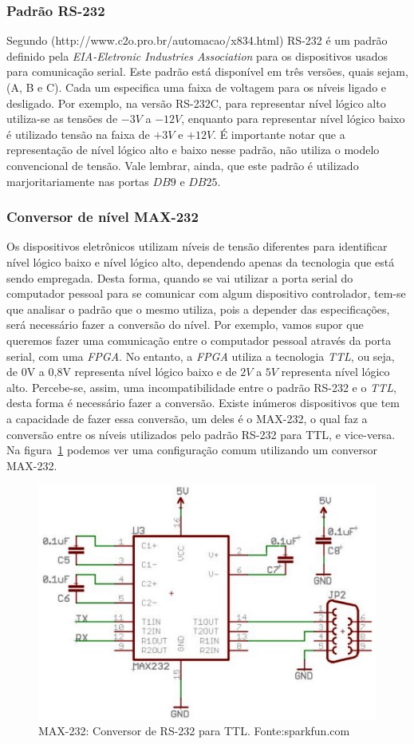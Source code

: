 \documentclass[12pt]{article}
\begin{document}
\subsubsection{Padrão RS-232}
Segundo (http://www.c2o.pro.br/automacao/x834.html) RS-232 é um padrão definido pela \textit{EIA-Eletronic Industries Association} para os dispositivos usados para comunicação serial. Este padrão está disponível em três versões, quais sejam, (A, B e C). Cada um especifica uma faixa de voltagem para os níveis ligado e desligado. Por exemplo, na versão RS-232C, para representar  nível lógico alto utiliza-se as tensões de $-3V$ a $-12V$, enquanto para representar nível lógico baixo é utilizado tensão na faixa de $+3V$ e $+12V$. É importante notar que a representação de nível lógico alto e baixo nesse padrão, não utiliza o modelo convencional de tensão. Vale lembrar, ainda, que este padrão é utilizado marjoritariamente nas portas $DB9$ e $DB25$.  

\subsubsection{Conversor de nível MAX-232}
Os dispositivos eletrônicos utilizam níveis de tensão diferentes para identificar nível lógico baixo e nível lógico alto, dependendo apenas da tecnologia que está sendo empregada. Desta forma, quando se vai utilizar a porta serial do computador pessoal para se comunicar com algum dispositivo controlador, tem-se que analisar o padrão que o mesmo utiliza, pois a depender das especificações, será necessário fazer a conversão do nível. Por exemplo, vamos supor que queremos fazer uma comunicação entre o computador pessoal através da porta serial, com uma \textit{FPGA}. No entanto, a \textit{FPGA} utiliza a tecnologia \textit{TTL}, ou seja, de 0V a 0,8V representa nível lógico baixo e de $2V$ a $5V$ representa nível lógico alto. Percebe-se, assim, uma incompatibilidade entre o padrão RS-232 e o \textit{TTL}, desta forma é necessário fazer a conversão. Existe inúmeros dispositivos que tem a capacidade de fazer essa conversão, um deles é o MAX-232, o qual faz  a conversão entre os níveis utilizados pelo padrão RS-232 para TTL, e vice-versa. Na figura~\ref{fig:232} podemos ver uma configuração comum utilizando um conversor MAX-232. 


\begin{figure}[h]
\centering
\includegraphics[width=.5\textwidth]{img/Fig11-microcontroller_uart_max232_circuit.jpg}
\caption{MAX-232: Conversor de RS-232 para TTL. Fonte:sparkfun.com}
\label{fig:232}
\end{figure}
\end{document}
